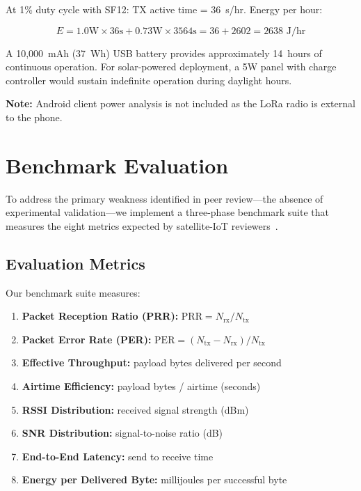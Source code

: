 \documentclass[11pt,a4paper]{article}
\begin{document}
At 1\% duty cycle with SF12: TX active time = 36~s/hr. Energy per hour:

\begin{equation}
E = 1.0\text{W} \times 36\text{s} + 0.73\text{W} \times 3564\text{s} = 36 + 2602 = 2638\text{ J/hr}
\end{equation}

A 10,000~mAh (37~Wh) USB battery provides approximately 14~hours of continuous operation. For solar-powered deployment, a 5W panel with charge controller would sustain indefinite operation during daylight hours.

\textbf{Note:} Android client power analysis is not included as the LoRa radio is external to the phone.

\section{Benchmark Evaluation}
\label{sec:benchmark}

To address the primary weakness identified in peer review---the absence of experimental validation---we implement a three-phase benchmark suite that measures the eight metrics expected by satellite-IoT reviewers~\cite{traspadini2025ns3ntn}.

\subsection{Evaluation Metrics}

Our benchmark suite measures:
\begin{enumerate}
    \item \textbf{Packet Reception Ratio (PRR):} $\text{PRR} = N_{\text{rx}} / N_{\text{tx}}$
    \item \textbf{Packet Error Rate (PER):} $\text{PER} = (N_{\text{tx}} - N_{\text{rx}}) / N_{\text{tx}}$
    \item \textbf{Effective Throughput:} payload bytes delivered per second
    \item \textbf{Airtime Efficiency:} payload bytes / airtime (seconds)
    \item \textbf{RSSI Distribution:} received signal strength (dBm)
    \item \textbf{SNR Distribution:} signal-to-noise ratio (dB)
    \item \textbf{End-to-End Latency:} send to receive time
    \item \textbf{Energy per Delivered Byte:} millijoules per successful byte
\end{enumerate}
\end{document}
